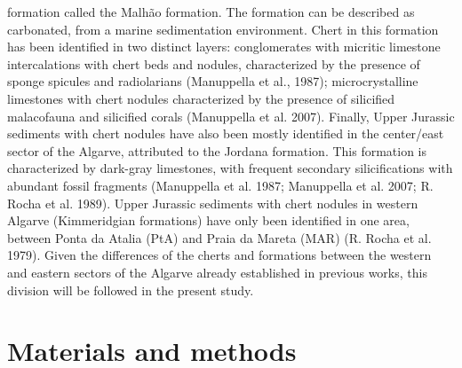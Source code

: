 \documentclass[
  a4paper,
  DIV=11,
  numbers=noendperiod]{scrreprt}
\begin{document}
formation called the Malhão formation. The formation can be described as
carbonated, from a marine sedimentation environment. Chert in this
formation has been identified in two distinct layers: conglomerates with
micritic limestone intercalations with chert beds and nodules,
characterized by the presence of sponge spicules and radiolarians
(Manuppella et al., 1987); microcrystalline limestones with chert
nodules characterized by the presence of silicified malacofauna and
silicified corals (Manuppella et al. 2007). Finally, Upper Jurassic
sediments with chert nodules have also been mostly identified in the
center/east sector of the Algarve, attributed to the Jordana formation.
This formation is characterized by dark-gray limestones, with frequent
secondary silicifications with abundant fossil fragments (Manuppella et
al. 1987; Manuppella et al. 2007; R. Rocha et al. 1989). Upper Jurassic
sediments with chert nodules in western Algarve (Kimmeridgian
formations) have only been identified in one area, between Ponta da
Atalia (PtA) and Praia da Mareta (MAR) (R. Rocha et al. 1979). Given the
differences of the cherts and formations between the western and eastern
sectors of the Algarve already established in previous works, this
division will be followed in the present study.

\section{Materials and methods}\label{materials-and-methods}
\end{document}

